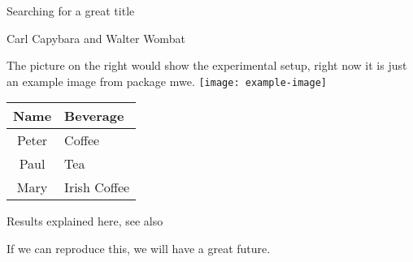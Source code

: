 \documentclass[12pt]{article}
\begin{document}
\pagestyle{empty}
\begin{tcolorbox}[colback=white,colframe=blue!75!black]
	\centering
	\Huge {\sffamily Searching for a great title} \par
	\large Carl Capybara and Walter Wombat
\end{tcolorbox}
\begin{tcolorbox}[title=Abstract ]
	\blindtext
\end{tcolorbox}
\begin{tcbraster}[raster columns=3]
	\begin{tcolorbox}[ title=Experimental Setup ]
		\blindtext
	\end{tcolorbox}
	\begin{tcolorbox}[title =Experimental setup, raster multicolumn=2,sidebyside]
		The picture on the right would show the
		experimental setup\autocite{ctan}, right now it is just an
		example image from package
		mwe\autocite{aristotle:physics}.
		\tcblower
		\centering
		\texttt{[image: example-image]}
	\end{tcolorbox}
	\begin{tcolorbox}[title =Results]
		\begin{center}
		\begin{tabular}{cl}
			Name & Beverage \\\hline
			Peter & Coffee \\
			Paul  & Tea \\
			Mary & Irish Coffee \\
		\end{tabular}
		\end{center}

		Results explained here, see also
		\autocite{westfahl:space,companion}
	\end{tcolorbox}
	\begin{tcolorbox}[title = more results, raster multicolumn=2]
		\blindtext
	\end{tcolorbox}
	\begin{tcolorbox}[raster multicolumn=2,title = Outlook ]
		If we can reproduce this, we will have a great
		future. \blindtext
	\end{tcolorbox}
	\begin{tcolorbox}[colback=white,colframe=white]
	\end{tcolorbox}
	\begin{tcolorbox}[raster multicolumn=3,title =References]
		\printbibliography[heading=none]
	\end{tcolorbox}
\end{tcbraster}
\end{document}
